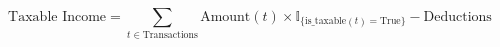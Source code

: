 \begin{equation}
    \text{Taxable Income} = \sum_{t \in \text{Transactions}} \text{Amount}(t) \times \mathbb{I}_{\{\text{is\_taxable}(t) = \text{True}\}} - \text{Deductions}
\end{equation}

